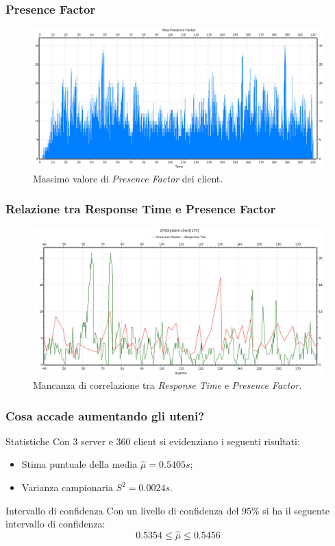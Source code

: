 \begin{frame}
\frametitle{Presence Factor}
\begin{figure}
\begin{center}
\includegraphics[scale=0.34]{maxPresenceFactor.jpeg}
\end{center}
\caption{Massimo valore di \emph{Presence Factor} dei client.}
\label{maxPresence}
\end{figure}
\end{frame}

\begin{frame}
\frametitle{Relazione tra Response Time e
Presence Factor}
\begin{figure}
\begin{center}
\includegraphics[scale=0.34]{responseVSpresence.jpeg}
\end{center}
\caption{Mancanza di correlazione tra \emph{Response Time} e
\emph{Presence Factor}.}
\label{responseVSPresence}
\end{figure}
\end{frame}

\begin{frame}
\frametitle{Cosa accade aumentando gli uteni?}
\begin{block}{Statistiche}
Con $3$ server e $360$ client si evidenziano
i seguenti risultati:
\begin{itemize}
\item
Stima puntuale della media $\hat{\mu} = 0.5405s$;
\item
Varianza campionaria $S^2 = 0.0024s$.
\end{itemize}
\end{block}
\pause
\vfill
\begin{exampleblock}{Intervallo di confidenza}
Con un livello di confidenza del $95$\% si ha il seguente intervallo di
confidenza:
\[
0.5354 \le \hat{\mu} \le 0.5456
\]
\end{exampleblock}
\end{frame}
